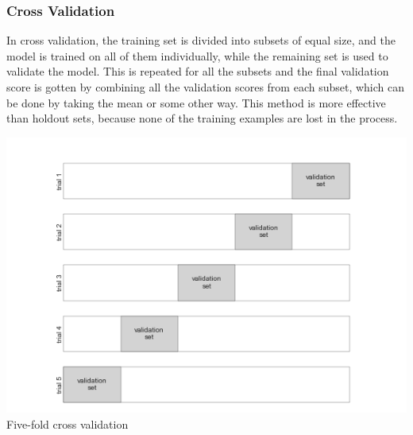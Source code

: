 \documentclass[12pt]{article}
\begin{document}
\subsubsection*{Cross Validation}
In cross validation, the training set is divided into subsets of equal size, and the model is trained on all of them individually, while the remaining set is used to validate the model. This is repeated for all the subsets and the final validation score is gotten by combining all the validation scores from each subset, which can be done by taking the mean or some other way. This method is more effective than holdout sets, because none of the training examples are lost in the process.
\begin{center}
    \includegraphics*[width=15cm]{cv.png}\\
    Five-fold cross validation
\end{center}
\newpage
\end{document}
